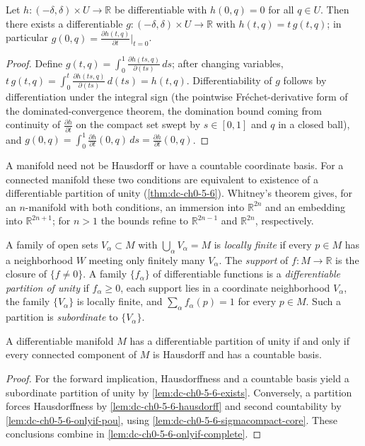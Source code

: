 \begin{lemma}
  \label{lem:dc-ch0-5-5}
  \leanok
  Let $h:(-\delta,\delta)\times U\to\mathbb{R}$ be differentiable with $h(0,q)=0$
  for all $q\in U$. Then there exists a differentiable
  $g:(-\delta,\delta)\times U\to\mathbb{R}$ with $h(t,q)=t\,g(t,q)$; in particular
  $g(0,q)=\frac{\partial h(t,q)}{\partial t}\big|_{t=0}$.
\end{lemma}
\begin{proof}
  \sketch
  \leanok
  Define $g(t,q)=\int_0^1\frac{\partial h(ts,q)}{\partial(ts)}\,ds$; after
  changing variables, $t\,g(t,q)=\int_0^t\frac{\partial h(ts,q)}{\partial(ts)}\,d(ts)=h(t,q)$.
  Differentiability of $g$ follows by differentiation under the integral sign
  (the pointwise Fréchet-derivative form of the dominated-convergence theorem, the
  domination bound coming from continuity of $\frac{\partial h}{\partial t}$ on the
  compact set swept by $s\in[0,1]$ and $q$ in a closed ball), and
  $g(0,q)=\int_0^1\frac{\partial h}{\partial t}(0,q)\,ds=\frac{\partial h}{\partial t}(0,q)$.
\end{proof}

A manifold need not be Hausdorff or have a countable coordinate basis. For a
connected manifold these two conditions are equivalent to existence of a
differentiable partition of unity (\cref{thm:dc-ch0-5-6}). Whitney's theorem
gives, for an $n$-manifold with both conditions, an immersion into
$\mathbb{R}^{2n}$ and an embedding into $\mathbb{R}^{2n+1}$; for $n>1$ the
bounds refine to $\mathbb{R}^{2n-1}$ and $\mathbb{R}^{2n}$, respectively.

A family of open sets $V_\alpha\subset M$ with $\bigcup_\alpha V_\alpha=M$ is
\emph{locally finite} if every $p\in M$ has a neighborhood $W$ meeting only
finitely many $V_\alpha$. The \emph{support} of $f:M\to\mathbb{R}$ is the
closure of $\{f\neq0\}$. A family $\{f_\alpha\}$ of differentiable functions is
a \emph{differentiable partition of unity} if $f_\alpha\ge0$, each support lies
in a coordinate neighborhood $V_\alpha$, the family $\{V_\alpha\}$ is locally
finite, and $\sum_\alpha f_\alpha(p)=1$ for every $p\in M$. Such a partition is
\emph{subordinate} to $\{V_\alpha\}$.

\begin{theorem}
  \label{thm:dc-ch0-5-6}
  A differentiable manifold $M$ has a differentiable partition of unity if and only
  if every connected component of $M$ is Hausdorff and has a countable basis.
\end{theorem}
\begin{proof}
  \sketch
  For the forward implication, Hausdorffness and a countable basis yield a subordinate
  partition of unity by \cref{lem:dc-ch0-5-6-exists}. Conversely, a partition forces
  Hausdorffness by \cref{lem:dc-ch0-5-6-hausdorff} and second countability by
  \cref{lem:dc-ch0-5-6-onlyif-pou}, using
  \cref{lem:dc-ch0-5-6-sigmacompact-core}. These conclusions combine in
  \cref{lem:dc-ch0-5-6-onlyif-complete}.
\end{proof}


